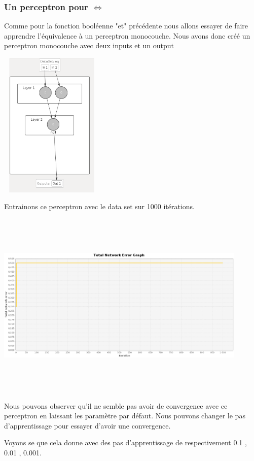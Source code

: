\documentclass[twoside,openright,a4paper,11pt,french]{article}
\begin{document}
\subsubsection{Un perceptron pour $\Leftrightarrow$}

Comme pour la fonction booléenne "et" précédente nous allons essayer de faire apprendre
l'équivalence à un perceptron monocouche. Nous avons donc créé un perceptron monocouche
avec deux inputs et un output

\includegraphics[width=5cm,height=7cm]{./pics/eq/perceptron_mono.eps}

Entrainons ce perceptron avec le data set sur 1000 itérations.

\includegraphics[width=12cm,height=9cm]{./pics/eq/mono_eq_def.eps}

Nous pouvons observer qu'il ne semble pas avoir de convergence avec ce perceptron
en laissant les paramètre par défaut.
Nous pouvons changer le pas d'apprentissage pour essayer d'avoir
une convergence.

Voyons se que cela donne avec des pas d'apprentissage de respectivement 0.1 , 0.01 , 0.001.
\end{document}
